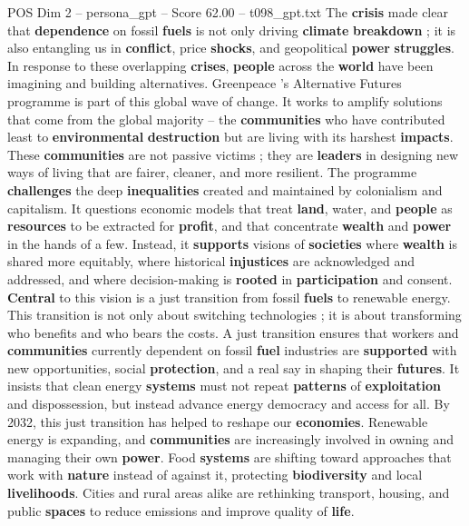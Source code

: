 \begin{textsample}{POS Dim 2 – persona\_gpt – Score 62.00 – t098\_gpt.txt}
The \textbf{crisis} made clear that \textbf{dependence} on fossil \textbf{fuels} is not only driving \textbf{climate} \textbf{breakdown} ; it is also entangling us in \textbf{conflict}, price \textbf{shocks}, and geopolitical \textbf{power} \textbf{struggles}.
In response to these overlapping \textbf{crises}, \textbf{people} across the \textbf{world} have been imagining and building alternatives.
Greenpeace ’s Alternative Futures programme is part of this global wave of change.
It works to amplify solutions that come from the global majority – the \textbf{communities} who have contributed least to \textbf{environmental} \textbf{destruction} but are living with its harshest \textbf{impacts}.
These \textbf{communities} are not passive victims ; they are \textbf{leaders} in designing new ways of living that are fairer, cleaner, and more resilient.
The programme \textbf{challenges} the deep \textbf{inequalities} created and maintained by colonialism and capitalism.
It questions economic models that treat \textbf{land}, water, and \textbf{people} as \textbf{resources} to be extracted for \textbf{profit}, and that concentrate \textbf{wealth} and \textbf{power} in the hands of a few.
Instead, it \textbf{supports} visions of \textbf{societies} where \textbf{wealth} is shared more equitably, where historical \textbf{injustices} are acknowledged and addressed, and where decision-making is \textbf{rooted} in \textbf{participation} and consent. \textbf{Central} to this vision is a just transition from fossil \textbf{fuels} to renewable energy.
This transition is not only about switching technologies ; it is about transforming who benefits and who bears the costs.
A just transition ensures that workers and \textbf{communities} currently dependent on fossil \textbf{fuel} industries are \textbf{supported} with new opportunities, social \textbf{protection}, and a real say in shaping their \textbf{futures}.
It insists that clean energy \textbf{systems} must not repeat \textbf{patterns} of \textbf{exploitation} and dispossession, but instead advance energy democracy and access for all.
By 2032, this just transition has helped to reshape our \textbf{economies}.
Renewable energy is expanding, and \textbf{communities} are increasingly involved in owning and managing their own \textbf{power}.
Food \textbf{systems} are shifting toward approaches that work with \textbf{nature} instead of against it, protecting \textbf{biodiversity} and local \textbf{livelihoods}.
Cities and rural areas alike are rethinking transport, housing, and public \textbf{spaces} to reduce emissions and improve quality of \textbf{life}.

\end{textsample}
